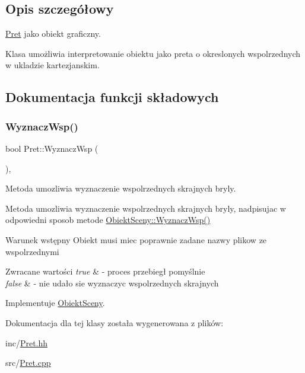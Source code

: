 \subsection{Opis szczegółowy}
\hyperlink{classPret}{Pret} jako obiekt graficzny. 

Klasa umożliwia interpretowanie obiektu jako preta o okreslonych wspolrzednych w ukladzie kartezjanskim. 

\subsection{Dokumentacja funkcji składowych}
\mbox{\label{classPret_affe3fdc72a84022eb5bbfddbf24cc2fc}} 
\subsubsection{\texorpdfstring{Wyznacz\+Wsp()}{WyznaczWsp()}}
{\footnotesize\ttfamily bool Pret\+::\+Wyznacz\+Wsp (\begin{DoxyParamCaption}{ }\end{DoxyParamCaption})\hspace{0.3cm}{\ttfamily [override]}, {\ttfamily [virtual]}}



Metoda umozliwia wyznaczenie wspolrzednych skrajnych bryly. 

Metoda umozliwia wyznaczenie wspolrzednych skrajnych bryly, nadpisujac w odpowiedni sposob metode \hyperlink{classObiektSceny_a24dd0332c0755d7155128639a9a3e2b4}{Obiekt\+Sceny\+::\+Wyznacz\+Wsp()}

\begin{DoxyPrecond}{Warunek wstępny}
Obiekt musi miec poprawnie zadane nazwy plikow ze wspolrzednymi 
\end{DoxyPrecond}

\begin{DoxyRetVals}{Zwracane wartości}
{\em true} & -\/ proces przebiegł pomyślnie \\
\hline
{\em false} & -\/ nie udało sie wyznaczyc wspolrzednych skrajnych \\
\hline
\end{DoxyRetVals}


Implementuje \hyperlink{classObiektSceny_a24dd0332c0755d7155128639a9a3e2b4}{Obiekt\+Sceny}.



Dokumentacja dla tej klasy została wygenerowana z plików\+:\begin{DoxyCompactItemize}
\item 
inc/\hyperlink{Pret_8hh}{Pret.\+hh}\item 
src/\hyperlink{Pret_8cpp}{Pret.\+cpp}\end{DoxyCompactItemize}
